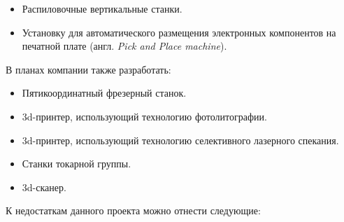 \begin{itemize}
	\item Распиловочные вертикальные станки.
	
	\item Установку для автоматического размещения электронных компонентов на печатной плате (англ. \textit{Pick and Place machine}).
	
	
\end{itemize}
В планах компании также разработать:
\begin{itemize}
	\item Пятикоординатный фрезерный станок.
	
	\item 3d-принтер, использующий технологию фотолитографии.
	
	\item 3d-принтер, использующий технологию селективного лазерного спекания.
	
	\item Станки токарной группы.
	
	\item 3d-сканер.
	
	
\end{itemize}
К недостаткам данного проекта можно отнести следующие:
